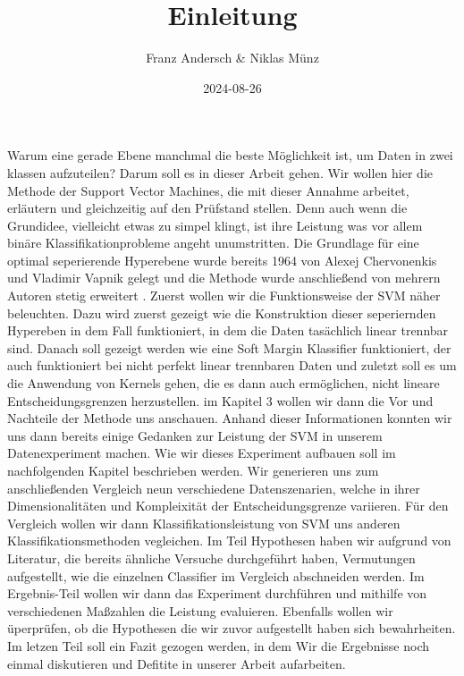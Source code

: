 \documentclass[
]{article}
\title{Einleitung}
\author{Franz Andersch \& Niklas Münz}
\date{2024-08-26}
\renewcommand{\maketitle}{}
\begin{document}
\maketitle

Warum eine gerade Ebene manchmal die beste Möglichkeit ist, um Daten in
zwei klassen aufzuteilen? Darum soll es in dieser Arbeit gehen. Wir
wollen hier die Methode der Support Vector Machines, die mit dieser
Annahme arbeitet, erläutern und gleichzeitig auf den Prüfstand stellen.
Denn auch wenn die Grundidee, vielleicht etwas zu simpel klingt, ist
ihre Leistung was vor allem binäre Klassifikationprobleme angeht
unumstritten. Die Grundlage für eine optimal seperierende Hyperebene
wurde bereits 1964 von Alexej Chervonenkis und Vladimir Vapnik gelegt
und die Methode wurde anschließend von mehrern Autoren stetig erweitert
\parencite{vapnikEstimationDependencesBased2006}. Zuerst wollen wir die
Funktionsweise der SVM näher beleuchten. Dazu wird zuerst gezeigt wie
die Konstruktion dieser seperiernden Hypereben in dem Fall funktioniert,
in dem die Daten tasächlich linear trennbar sind. Danach soll gezeigt
werden wie eine Soft Margin Klassifier funktioniert, der auch
funktioniert bei nicht perfekt linear trennbaren Daten und zuletzt soll
es um die Anwendung von Kernels gehen, die es dann auch ermöglichen,
nicht lineare Entscheidungsgrenzen herzustellen. im Kapitel 3 wollen wir
dann die Vor und Nachteile der Methode uns anschauen. Anhand dieser
Informationen konnten wir uns dann bereits einige Gedanken zur Leistung
der SVM in unserem Datenexperiment machen. Wie wir dieses Experiment
aufbauen soll im nachfolgenden Kapitel beschrieben werden. Wir
generieren uns zum anschließenden Vergleich neun verschiedene
Datenszenarien, welche in ihrer Dimensionalitäten und Kompleixität der
Entscheidungsgrenze variieren. Für den Vergleich wollen wir dann
Klassifikationsleistung von SVM uns anderen Klassifikationsmethoden
vegleichen. Im Teil Hypothesen haben wir aufgrund von Literatur, die
bereits ähnliche Versuche durchgeführt haben, Vermutungen aufgestellt,
wie die einzelnen Classifier im Vergleich abschneiden werden. Im
Ergebnis-Teil wollen wir dann das Experiment durchführen und mithilfe
von verschiedenen Maßzahlen die Leistung evaluieren. Ebenfalls wollen
wir üperprüfen, ob die Hypothesen die wir zuvor aufgestellt haben sich
bewahrheiten. Im letzen Teil soll ein Fazit gezogen werden, in dem Wir
die Ergebnisse noch einmal diskutieren und Defitite in unserer Arbeit
aufarbeiten.

\printbibliography
\end{document}
